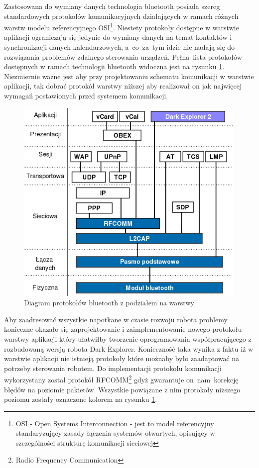 Zastosowana do wymiany danych technologia bluetooth posiada szereg standardowych
protokołów komunikacyjnych działających w ramach różnych warstw modelu
referencyjnego OSI\footnote{OSI - Open Systems Interconnection - jest to model
referencyjny standaryzujący zasady łączenia systemów otwartych, opisujący w
szczególności strukturę komunikacji sieciowej }. Niestety protokoły dostępne w
warstwie aplikacji ograniczają się jedynie do wymiany danych na temat kontaktów i
synchronizacji danych kalendarzowych, a~co~za~tym idzie nie nadają się do
rozwiązania problemów zdalnego sterowania urządzeń. Pełna~lista protokołów
dostępnych w ramach technologii bluetooth widoczna jest na rysunku
\ref{fig:BtStack}. Niezmiernie ważne jest aby przy projektowaniu schematu
komunikacji w warstwie aplikacji, tak dobrać protokół warstwy niższej aby
realizował on jak najwięcej wymagań postawionych przed systemem komunikacji.

\begin{figure}[h!]
 \centering 
 \includegraphics[height=100mm]{../images/ch05/btstack.png}
 \caption{Diagram protokołów bluetooth z podziałem na warstwy}
 \label{fig:BtStack}
\end{figure}

Aby zaadresować wszystkie napotkane w czasie rozwoju robota problemy konieczne
okazało się zaprojektowanie i zaimplementowanie nowego protokołu warstwy
aplikacji który ułatwiłby tworzenie oprogramowania współpracującego z rozbudowaną
wersją robota Dark Explorer. Konieczność taka wynika z faktu iż w warstwie
aplikacji nie istnieją protokoły które możnaby było zaadaptować na potrzeby
sterowania robotem.  Do implementacji protokołu komunikacji wykorzystany został
protokół RFCOMM\footnote{Radio Frequency Communication} gdyż gwarantuje on~nam~korekcję błędów na poziomie pakietów. Wszystkie powiązane z nim protokoły
niższego poziomu zostały oznaczone kolorem na rysunku \ref{fig:BtStack}.

